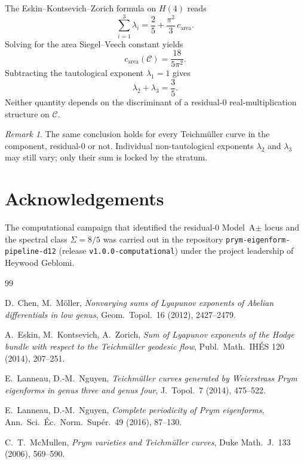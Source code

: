 \documentclass[11pt,a4paper]{article}
\theoremstyle{definition}
\theoremstyle{remark}
\newtheorem{remark}[theorem]{Remark}
\begin{document}
The Eskin--Kontsevich--Zorich formula on $H(4)$ reads
\[
\sum_{i=1}^{3}\lambda_i
=
\frac{2}{5}+\frac{\pi^2}{3}\,c_{\mathrm{area}}.
\]
Solving for the area Siegel--Veech constant yields
\[
c_{\mathrm{area}}(\mathcal{C})=\frac{18}{5\pi^2}.
\]
Subtracting the tautological exponent $\lambda_1=1$ gives
\[
\lambda_2+\lambda_3=\frac{3}{5}.
\]
Neither quantity depends on the discriminant of a residual-0 real-multiplication
structure on $\mathcal{C}$.

\begin{remark}
The same conclusion holds for every Teichm\"uller curve in the component, residual-0
or not. Individual non-tautological exponents $\lambda_2$ and $\lambda_3$ may still
vary; only their sum is locked by the stratum.
\end{remark}

\section*{Acknowledgements}
The computational campaign that identified the residual-0 Model~A$\pm$ locus and
the spectral class $\Sigma=8/5$ was carried out in the repository
\texttt{prym-eigenform-pipeline-d12} (release \texttt{v1.0.0-computational})
under the project leadership of Heywood Geblomi.

\begin{thebibliography}{99}

D.~Chen, M.~M\"oller,
\textit{Nonvarying sums of Lyapunov exponents of Abelian differentials in low genus},
Geom.\ Topol.\ 16 (2012), 2427--2479.

A.~Eskin, M.~Kontsevich, A.~Zorich,
\textit{Sum of Lyapunov exponents of the Hodge bundle with respect to the
Teichm\"uller geodesic flow},
Publ.\ Math.\ IH\'ES 120 (2014), 207--251.

E.~Lanneau, D.-M.~Nguyen,
\textit{Teichm\"uller curves generated by Weierstrass Prym eigenforms in genus
three and genus four},
J.\ Topol.\ 7 (2014), 475--522.

E.~Lanneau, D.-M.~Nguyen,
\textit{Complete periodicity of Prym eigenforms},
Ann.\ Sci.\ \'Ec.\ Norm.\ Sup\'er.\ 49 (2016), 87--130.

C.~T.~McMullen,
\textit{Prym varieties and Teichm\"uller curves},
Duke Math.\ J.\ 133 (2006), 569--590.

\end{thebibliography}
\end{document}
